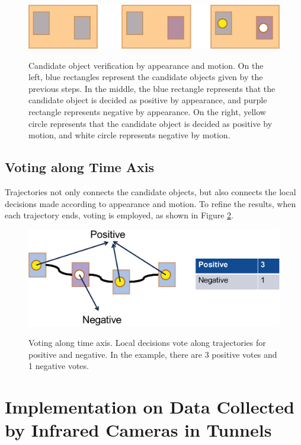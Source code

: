 \begin{figure}
\centering
{
  \includegraphics[width=1\textwidth]{add2.eps}
}
\caption[Candidate object verification]{Candidate object verification by appearance and motion. On the left, blue rectangles represent the candidate objects given by the previous steps. In the middle, the blue rectangle represents that the candidate object is decided as positive by appearance, and purple rectangle represents negative by appearance. On the right, yellow circle represents that the candidate object is decided as positive by motion, and white circle represents negative by motion. }
\label{ord:add2}
\end{figure}
\subsection{Voting along Time Axis}
Trajectories not only connects the candidate objects, but also connects the local decisions made according to appearance and motion. To refine the results, when each trajectory ends, voting is employed, as shown in Figure \ref{ord:add3}.


\begin{figure}
\centering
{
  \includegraphics[width=1\textwidth]{add3.eps}
}
\caption[Voting along time axis]{Voting along time axis. Local decisions vote along trajectories for positive and negative. In the example, there are 3 positive votes and 1 negative votes.}
\label{ord:add3}
\end{figure}

\section{Implementation on Data Collected by Infrared Cameras in Tunnels}
\label{pip}

